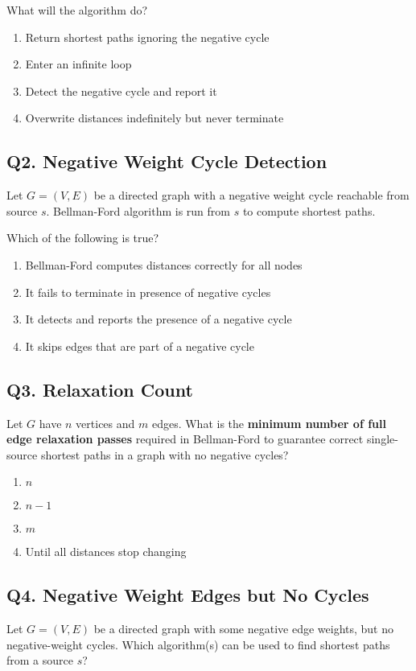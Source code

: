 What will the algorithm do?

\begin{enumerate}[label=(\alph*)]
    \item Return shortest paths ignoring the negative cycle
    \item Enter an infinite loop
    \item Detect the negative cycle and report it
    \item Overwrite distances indefinitely but never terminate
\end{enumerate}

\subsection*{Q2. Negative Weight Cycle Detection}
Let $G = (V, E)$ be a directed graph with a negative weight cycle reachable from source $s$. Bellman-Ford algorithm is run from $s$ to compute shortest paths.

Which of the following is true?

\begin{enumerate}[label=(\alph*)]
    \item Bellman-Ford computes distances correctly for all nodes
    \item It fails to terminate in presence of negative cycles
    \item It detects and reports the presence of a negative cycle
    \item It skips edges that are part of a negative cycle
\end{enumerate}

\subsection*{Q3. Relaxation Count}
Let $G$ have $n$ vertices and $m$ edges. What is the \textbf{minimum number of full edge relaxation passes} required in Bellman-Ford to guarantee correct single-source shortest paths in a graph with no negative cycles?

\begin{enumerate}[label=(\alph*)]
    \item $n$
    \item $n-1$
    \item $m$
    \item Until all distances stop changing
\end{enumerate}

\subsection*{Q4. Negative Weight Edges but No Cycles}
Let $G = (V, E)$ be a directed graph with some negative edge weights, but no negative-weight cycles. Which algorithm(s) can be used to find shortest paths from a source $s$?

